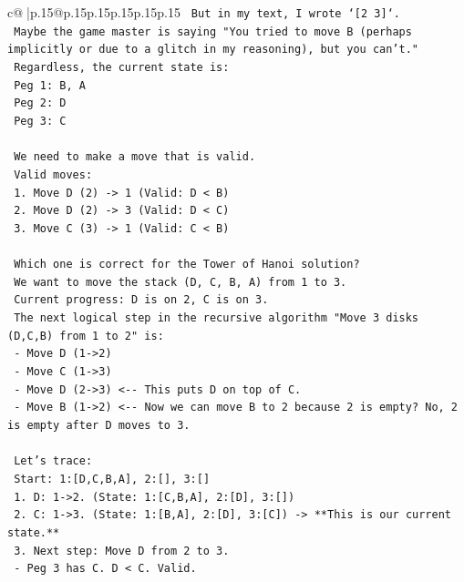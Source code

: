 \documentclass{article}
\begin{document}
{\begin{supertabular}{c@{$\;$}|p{.15\linewidth}@{}p{.15\linewidth}p{.15\linewidth}p{.15\linewidth}p{.15\linewidth}p{.15\linewidth}}
{{{\texttt{   But in my text, I wrote `{[}2 3{]}`.} \\
\texttt{   Maybe the game master is saying "You tried to move B (perhaps implicitly or due to a glitch in my reasoning), but you can't."} \\
\texttt{   Regardless, the current state is:} \\
\texttt{   Peg 1: B, A} \\
\texttt{   Peg 2: D} \\
\texttt{   Peg 3: C} \\
\\ 
\texttt{   We need to make a move that is valid.} \\
\texttt{   Valid moves:} \\
\texttt{   1. Move D (2) {-}> 1 (Valid: D < B)} \\
\texttt{   2. Move D (2) {-}> 3 (Valid: D < C)} \\
\texttt{   3. Move C (3) {-}> 1 (Valid: C < B)} \\
\\ 
\texttt{   Which one is correct for the Tower of Hanoi solution?} \\
\texttt{   We want to move the stack (D, C, B, A) from 1 to 3.} \\
\texttt{   Current progress: D is on 2, C is on 3.} \\
\texttt{   The next logical step in the recursive algorithm "Move 3 disks (D,C,B) from 1 to 2" is:} \\
\texttt{   {-} Move D (1{-}>2)} \\
\texttt{   {-} Move C (1{-}>3)} \\
\texttt{   {-} Move D (2{-}>3)  <{-}{-} This puts D on top of C.} \\
\texttt{   {-} Move B (1{-}>2)  <{-}{-} Now we can move B to 2 because 2 is empty? No, 2 is empty after D moves to 3.} \\
\\ 
\texttt{   Let's trace:} \\
\texttt{   Start: 1:{[}D,C,B,A{]}, 2:{[}{]}, 3:{[}{]}} \\
\texttt{   1. D: 1{-}>2. (State: 1:{[}C,B,A{]}, 2:{[}D{]}, 3:{[}{]})} \\
\texttt{   2. C: 1{-}>3. (State: 1:{[}B,A{]}, 2:{[}D{]}, 3:{[}C{]}) {-}> **This is our current state.**} \\
\texttt{   3. Next step: Move D from 2 to 3.} \\
\texttt{      {-} Peg 3 has C. D < C. Valid.} \\
}}}
\end{supertabular}}
\end{document}
